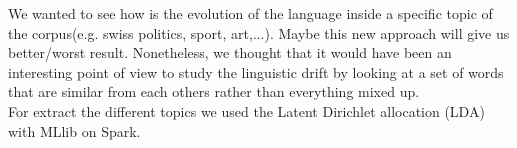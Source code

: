 We wanted to see how is the evolution of the language inside a specific topic of the corpus(e.g. swiss politics, sport, art,...). Maybe this new approach will give us better/worst result. Nonetheless, we thought that it would have been an interesting point of view to study the linguistic drift by looking at a set of words that are similar from each others rather than everything mixed up.\\
For extract the different topics we used the Latent Dirichlet allocation (LDA) with MLlib on Spark. 